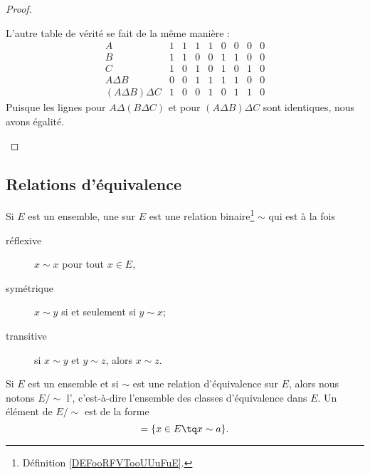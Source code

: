\begin{proof}
\begin{subproof}
           L'autre table de vérité se fait de la même manière :
           \begin{equation}
               \begin{array}{|c|c|c|c|c|c|c|c|c|}
                   A&1&1&1&1&0&0&0&0\\
                   B&1&1&0&0&1&1&0&0\\
                   C&1&0&1&0&1&0&1&0\\
                   \hline%
           A\Delta B&0&0&1&1&1&1&0&0\\
           \hline%
(A\Delta B)\Delta C &1&0&0&1&0&1&1&0
               \end{array}
           \end{equation}
           Puisque les lignes pour \( A\Delta (B\Delta C)\) et pour \( (A\Delta B)\Delta C\) sont identiques, nous avons égalité.
    \end{subproof}
\end{proof}

\subsection{Relations d'équivalence}
\label{appEquivalence}

\begin{definition}  \label{DefHoJzMp}
    Si $E$ est un ensemble, une  sur $E$ est une relation binaire\footnote{Définition \ref{DEFooRFVTooUUuFuE}.} $\sim$ qui est à la fois
\begin{description}
	\item[réflexive] $x\sim x$ pour tout $x\in E$,
	\item[symétrique] $x\sim y$ si et seulement si $y\sim x$;
	\item[transitive] si $x\sim y$ et $y\sim z$, alors $x\sim z$.
\end{description}
\end{definition}

\begin{definition}      \label{DEFooRHPSooHKBZXl}
    Si \( E\) est un ensemble et si \( \sim\) est une relation d'équivalence sur \( E\), alors nous notons \( E/\sim\) l', c'est-à-dire l'ensemble des classes d'équivalence dans \( E\). Un élément de \( E/\sim\) est de la forme
    \begin{equation}
        [a]=\{ x\in E\tq x\sim a \}.
    \end{equation}
\end{definition}

